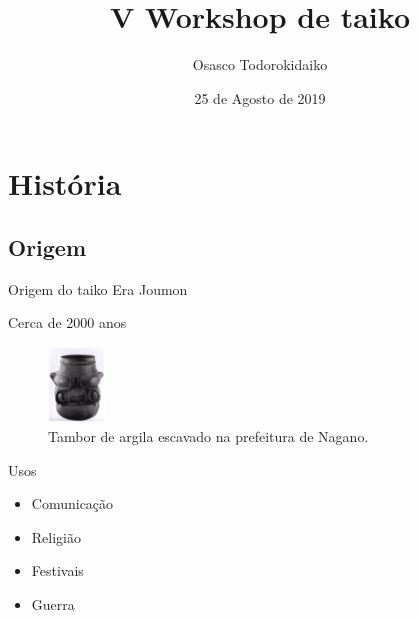 \documentclass{beamer}
\title{V Workshop de taiko}
\author{Osasco Todorokidaiko}
\date{25 de Agosto de 2019}
\begin{document}
\begin{frame}
    \maketitle
\end{frame}

\section{História}
\subsection{Origem}
\begin{frame}{Origem do taiko}\pause
    Era Joumon

    Cerca de 2000 anos
    \begin{figure}
    \includegraphics[height=2cm]{taiko-jomon}
        \caption {Tambor de argila escavado na prefeitura de Nagano.}
    \end{figure}

\end{frame}

\begin{frame}{Usos}
    \begin{itemize}\pause
        \item Comunicação \pause
        \item Religião \pause
        \item Festivais \pause
        \item Guerra
    \end{itemize}
\end{frame}
\end{document}
